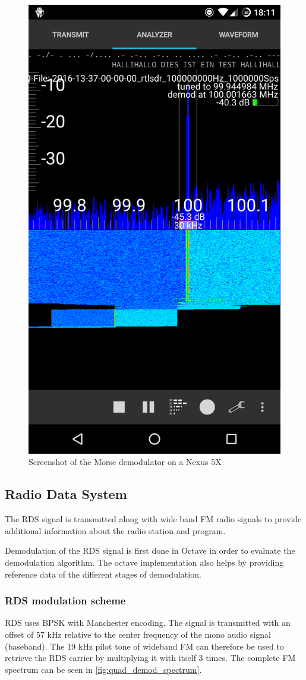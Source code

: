 \begin{figure}[h]
	\centering
	\includegraphics[width=0.5\linewidth]{gfx/screenshots/morse_screenshot_new.png}
	\caption{Screenshot of the Morse demodulator on a Nexus 5X}
	\label{fig:morse_screenshot_new}
\end{figure}



\subsection{Radio Data System \label{sec:rds}}

The \ac{RDS} signal is transmitted along with wide band \ac{FM}
radio signals to provide additional information about the
radio station and program.

Demodulation of the \ac{RDS} signal is first done in Octave in order to
evaluate the demodulation algorithm. The octave implementation
also helps by providing reference data of the different stages
of demodulation. 

\subsubsection{RDS modulation scheme}
\label{sec:rds_modulation_scheme}

\ac{RDS} uses \ac{BPSK} with Manchester encoding. The signal is
transmitted with an offset of 57 kHz relative to the center frequency
of the mono audio signal (baseband). The 19 kHz pilot tone of wideband \ac{FM}
can therefore be used to retrieve the \ac{RDS} carrier by multiplying
it with itself 3 times. The complete FM spectrum can be seen in
\autoref{fig:quad_demod_spectrum}.

